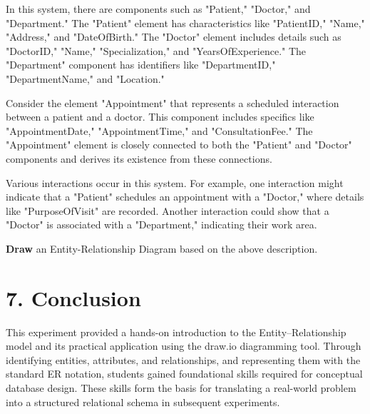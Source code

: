 \documentclass[12pt,a4paper]{article}
\begin{document}
In this system, there are components such as "Patient," "Doctor," and "Department." The "Patient" element has characteristics like "PatientID," "Name," "Address," and "DateOfBirth." The "Doctor" element includes details such as "DoctorID," "Name," "Specialization," and "YearsOfExperience." The "Department" component has identifiers like "DepartmentID," "DepartmentName," and "Location."

Consider the element "Appointment" that represents a scheduled interaction between a patient and a doctor. This component includes specifics like "AppointmentDate," "AppointmentTime," and "ConsultationFee." The "Appointment" element is closely connected to both the "Patient" and "Doctor" components and derives its existence from these connections.

Various interactions occur in this system. For example, one interaction might indicate that a "Patient" schedules an appointment with a "Doctor," where details like "PurposeOfVisit" are recorded. Another interaction could show that a "Doctor" is associated with a "Department," indicating their work area.

\textbf{Draw} an Entity-Relationship Diagram based on the above description.

\section*{7. Conclusion}
This experiment provided a hands-on introduction to the Entity–Relationship model and its practical
application using the draw.io diagramming tool. Through identifying entities, attributes, and
relationships, and representing them with the standard ER notation, students gained foundational
skills required for conceptual database design. These skills form the basis for translating a
real-world problem into a structured relational schema in subsequent experiments.
\end{document}
